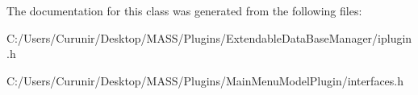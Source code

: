 The documentation for this class was generated from the following files\+:\begin{DoxyCompactItemize}
\item 
C\+:/\+Users/\+Curunir/\+Desktop/\+M\+A\+S\+S/\+Plugins/\+Extendable\+Data\+Base\+Manager/iplugin.\+h\item 
C\+:/\+Users/\+Curunir/\+Desktop/\+M\+A\+S\+S/\+Plugins/\+Main\+Menu\+Model\+Plugin/interfaces.\+h\end{DoxyCompactItemize}
